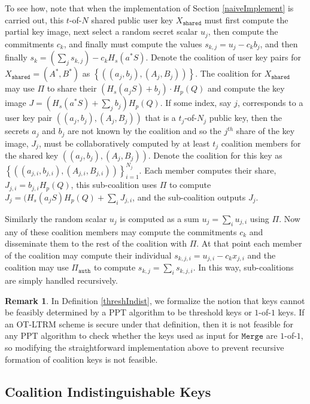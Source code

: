 \documentclass{mrl}
\theoremstyle{definition}
\newtheorem{disc}[theorem]{Remark}
\begin{document}
To see how, note that when the implementation of Section \ref{naiveImplement} is carried out, this $t$-of-$N$ shared public user key $X_{\texttt{shared}}$ must first compute the partial key image, next select a random secret scalar $u_j$, then compute the commitments $c_k$, and finally must compute the values $s_{k,j} = u_j - c_k b_j$, and then finally $s_k = (\sum_j s_{k,j}) - c_k H_s(a^* S)$. Denote the coalition of user key pairs for $X_{\texttt{shared}}=(A^*,B^*)$ as $\left\{((a_{j}, b_{j}), (A_{j}, B_{j}))\right\}$. The coalition for $X_\texttt{shared}$ may use $\Pi$ to share their $(H_s(a_{j} S) + b_{j})\cdot H_p(Q)$ and compute the key image $J = (H_s(a^* S) + \sum_j b_{j}) H_p(Q)$. If some index, say $j$, corresponds to a user key pair $((a_j,b_j),(A_j,B_j))$ that is a $t_j$-of-$N_j$ public key, then the secrets $a_j$ and $b_j$ are not known by the coalition and so the $j^{th}$ share of the key image, $J_j$, must be collaboratively computed by at least $t_j$ coalition members for the shared key $((a_j,b_j),(A_j,B_j))$. Denote the coalition for this key as $\left\{((a_{j,i}, b_{j,i}), (A_{j,i}, B_{j,i}))\right\}_{i=1}^{N_j}$. Each member computes their share, $J_{j,i} = b_{j,i}H_p(Q)$, this sub-coalition uses $\Pi$ to compute $J_j = (H_s(a_{j} S)H_p(Q) +   \sum_i J_{j,i}$, and the sub-coalition outputs $J_j$.

Similarly the random scalar $u_j$ is computed as a sum $u_j = \sum_i u_{j,i}$ using $\Pi$. Now any of these coalition members may compute the commitments $c_k$ and disseminate them to the rest of the coalition with $\Pi$. At that point each member of the coalition may compute their individual $s_{k,j,i} = u_{j,i} - c_k x_{j,i}$ and the coalition may use $\Pi_{\texttt{auth}}$ to compute $s_{k,j} = \sum_i s_{k,j,i}$. In this way, sub-coalitions are simply handled recursively.

\begin{disc} 
In Definition \ref{threshIndist}, we formalize the notion that keys cannot be feasibly determined by a PPT algorithm to be threshold keys or $1$-of-$1$ keys. If an OT-LTRM scheme is secure under that definition, then it is not feasible for any PPT algorithm to check whether the keys used as input for $\texttt{Merge}$ are $1$-of-$1$, so modifying the straightforward implementation above to prevent recursive formation of coalition keys is not feasible. \end{disc}


\subsection{Coalition Indistinguishable Keys} \label{subsec:CIK}
\end{document}

